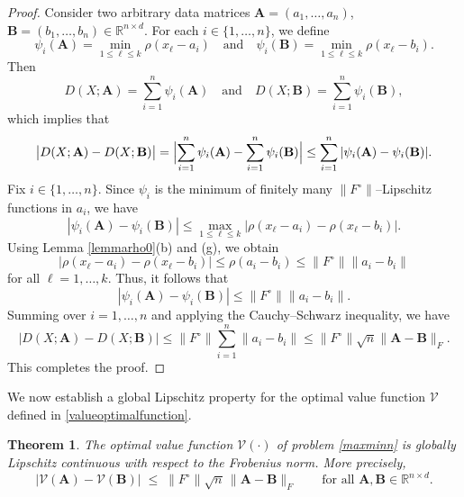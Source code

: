 \documentclass[11pt]{article}
\newtheorem{theorem}{Theorem}[section]
\theoremstyle{definition}
\newcommand{\R}{\mathbb{R}}
\newcommand{\1}{\mathbf{1}}
\begin{document}
\begin{proof}
Consider two arbitrary data matrices
$\mathbf{A}=(a_1,\dots,a_n)$, $\mathbf{B}=(b_1,\dots,b_n)\in\R^{n\times d}$. For
each $i\in\{1,\dots,n\}$, we define
\[
\psi_i(\mathbf{A})
=
\min_{1\le \ell \le k}\rho(x_\ell-a_i)
\quad\text{and}\quad
\psi_i(\mathbf{B})
=
\min_{1\le \ell \le k}\rho(x_\ell-b_i).
\]
Then
\[
D(X;\mathbf{A})
=
\sum_{i=1}^n \psi_i(\mathbf{A})
\quad\text{and}\quad
D(X;\mathbf{B})
=
\sum_{i=1}^n \psi_i(\mathbf{B}),
\]
which implies that
\[
\bigl|D(X;\mathbf{A})-D(X;\mathbf{B})\bigr|
=
\Bigl|\sum_{i=1}^n\psi_i(\mathbf{A})-\sum_{i=1}^n\psi_i(\mathbf{B})\Bigr|
\le
\sum_{i=1}^n|\psi_i(\mathbf{A})-\psi_i(\mathbf{B})|.
\]
Fix $i\in\{1,\dots,n\}$. Since $\psi_i$ is the minimum of finitely many
$\|F^\circ\|$--Lipschitz functions in $a_i$, we have
\[
|\psi_i(\mathbf{A})-\psi_i(\mathbf{B})|
\le
\max_{1\le \ell \le k}
\bigl|
\rho(x_\ell-a_i)-\rho(x_\ell-b_i)
\bigr|.
\]
Using Lemma \ref{lemmarho0}(b) and (g), we obtain
\[
\bigl| \rho(x_\ell-a_i)-\rho(x_\ell-b_i) \bigr| \le \rho(a_i-b_i) \le \|F^\circ\| \|a_i-b_i\|
\]
for all $\ell=1,\dots,k$. Thus, it follows that
\[
|\psi_i(\mathbf{A})-\psi_i(\mathbf{B})| \le \|F^\circ\| \|a_i-b_i\|.
\]
Summing over $i=1,\dots,n$ and applying the Cauchy–Schwarz inequality, we have
\[
|D(X;\mathbf{A})-D(X;\mathbf{B})| \le \|F^\circ\| \sum_{i=1}^n \|a_i-b_i\| \le \|F^\circ\| \sqrt{n} \|\mathbf{A}-\mathbf{B}\|_F.
\]
This completes
the proof.
\end{proof}

We now establish a global Lipschitz property for the optimal value function
$\mathcal{V}$ defined in \eqref{valueoptimalfunction}.

\begin{theorem}\label{thm:Lip-vk}
The optimal value function $\mathcal{V}(\cdot)$ of problem \eqref{maxminn}
is globally Lipschitz continuous with respect to the Frobenius norm. More
precisely,
\[
|\mathcal{V}(\mathbf{A})-\mathcal{V}(\mathbf{B})|
\;\le\;
\|F^\circ\|\sqrt{n}\,\|\mathbf{A}-\mathbf{B}\|_F
\qquad
\text{for all }\mathbf{A},\mathbf{B}\in\R^{n\times d}.
\]
\end{theorem}
\end{document}

